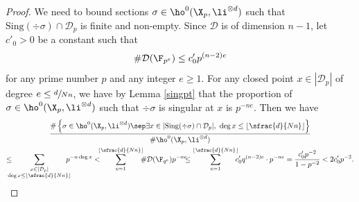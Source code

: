 \begin{proof}
We need to bound sections $\sigma\in \ho^0(\X_p, \li^{\otimes d})$ such that $\mathrm{Sing}(\div \sigma)\cap \mathcal{D}_p$ is finite and non-empty. Since $\mathcal{D}$ is of dimension $n-1$, let $c'_0>0$ be a constant such that
\[
\#\mathcal{D}(\F_{p^e}) \leq c'_0 p^{(n-2)e}
\]
for any prime number $p$ and any integer $e\geq 1$. For any closed point $x\in |\mathcal{D}_p|$ of degree $e\leq \sfrac{d}{Nn}$, we have by Lemma \ref{singpt} that the proportion of $\sigma\in \ho^0(\X_p, \li^{\otimes d})$ such that $\div \sigma$ is singular at $x$ is $p^{-ne}$. Then we have
\begin{multline*}
\frac{\#\left\{ \sigma\in \ho^0(\X_p, \li^{\otimes d})\sep \exists x\in |\mathrm{Sing}(\div \sigma)\cap \mathcal{D}_p|,\ \deg x\leq \lfloor \sfrac{d}{Nn} \rfloor \right\}}{\#\ho^0(\X_p, \li^{\otimes d})}\\
\leq \hspace*{-3mm}\sum_{\substack{x\in |\mathcal{D}_p|\\ \deg x\leq \lfloor \sfrac{d}{Nn} \rfloor}} \hspace*{-3mm}p^{-n\deg x} 
< \hspace*{-2mm}\sum_{e=1}^{\lfloor \sfrac{d}{Nn} \rfloor}\hspace*{-2mm} \#\mathcal{D}(\F_{q^e}) p^{-ne}\hspace*{-2mm}\leq \sum_{e=1}^{\lfloor \sfrac{d}{Nn} \rfloor}\hspace*{-2mm}c'_0 q^{(n-2)e}\cdot p^{-ne}
=\frac{c'_0p^{-2}}{1-p^{-2}}< 2c'_0p^{-2}.
\end{multline*}


\end{proof}
